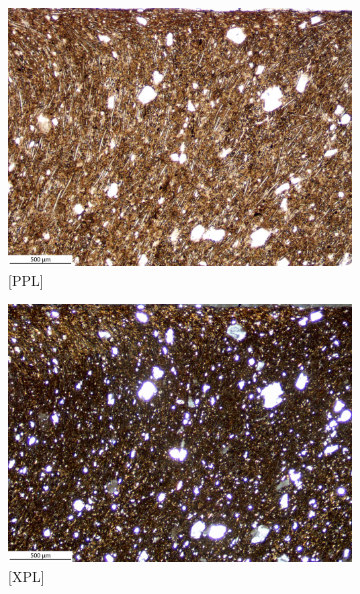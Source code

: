 \documentclass[a4paper]{article}
\begin{document}
\begin{figure}[H]
	\centering
	\begin{subfigure}[t]{.49\textwidth}
		\includegraphics[width=\textwidth]{ThinSections/17-1_4x_PPL.jpg}
		\caption{[PPL]}
	\end{subfigure}\hspace{.5em}\hfill
	\begin{subfigure}[t]{.49\textwidth}
		\includegraphics[width=\textwidth]{ThinSections/17-1_4x_XPL.jpg}
		\caption{[XPL]}
	\end{subfigure}
	\begin{subfigure}[t]{.32\textwidth}

\end{subfigure}
\end{figure}
\end{document}
